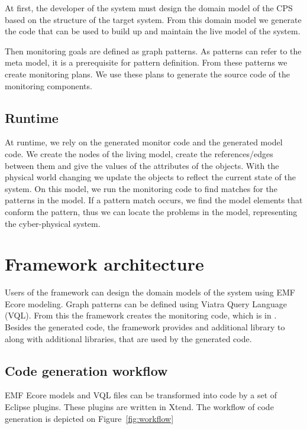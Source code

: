 At first, the developer of the system must design the domain model of the CPS based on the structure of the target system.
From this domain model we generate the code that can be used to build up and maintain the live model of the system.

Then monitoring goals are defined as graph patterns. 
As patterns can refer to the meta model, it is a prerequisite for pattern definition. 
From these patterns we create monitoring plans. 
We use these plans to generate the source code of the monitoring components.

\subsection{Runtime}

At runtime, we rely on the generated monitor code and the generated model code. 
We create the nodes of the living model, create the references/edges between them and give the values of the attributes of the objects. 
With the physical world changing we update the objects to reflect the current state of the system. 
On this model, we run the monitoring code to find matches for the patterns in the model. 
If a pattern match occurs, we find the model elements that conform the pattern, thus we can locate the problems in the model, representing the cyber-physical system.


\section{Framework architecture}

Users of the framework can design the domain models of the system using EMF Ecore modeling.
Graph patterns can be defined using Viatra Query Language (VQL).
From this the framework creates the monitoring code, which is in \cpp{}.
Besides the generated code, the framework provides and additional library to  along with additional libraries, that are used by the generated code. 

\subsection{Code generation workflow}
EMF Ecore models and VQL files can be transformed into \cpp code by a set of Eclipse plugins.
These plugins are written in Xtend.
The workflow of code generation is depicted on Figure~\ref{fig:workflow}

